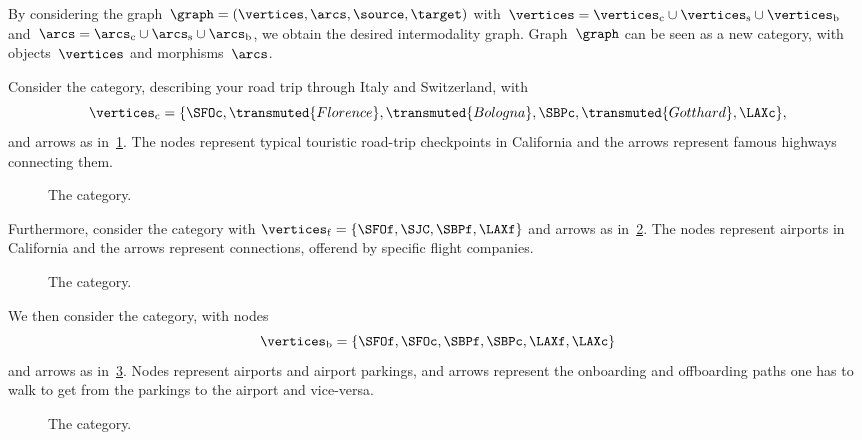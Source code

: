 By considering the graph~$\graph=(\vertices,\arcs,\source,\target)$ with~$\vertices=\vertices_\mathrm{c}\cup \vertices_\mathrm{s}\cup \vertices_\mathrm{b}$ and~$\arcs=\arcs_\mathrm{c}\cup \arcs_\mathrm{s}\cup \arcs_\mathrm{b}$, we obtain the desired intermodality graph. Graph~$\graph$ can be seen as a new category, with objects~$\vertices$ and morphisms~$\arcs$.
\begin{example}
  Consider the \Car category, describing your road trip through Italy and Switzerland, with
  \begin{equation*}
    \vertices_\mathrm{c}=\{\SFOc, \transmuted{Florence},\transmuted{Bologna},\SBPc,\transmuted{Gotthard},\LAXc\},
  \end{equation*}
  and arrows as in~\cref{fig:carcat}. The nodes represent typical touristic road-trip checkpoints in California and the arrows represent famous highways connecting them.

  \begin{figure}[h!]
    \begin{center}
    \end{center}
    \caption{The \Car category.}
    \label{fig:carcat}
  \end{figure}

  Furthermore, consider the \Flight category with $\vertices_\mathrm{f}=\{\SFOf, \SJC, \SBPf, \LAXf\}$ and arrows as in~\cref{fig:flight}. The nodes represent airports in California and the arrows represent connections, offerend by specific flight companies.

  \begin{figure}[h!]
    \begin{center}
    \end{center}
    \caption{The \Flight category.}
     \label{fig:flight}
  \end{figure}

  We then consider the \Board category, with nodes
  \begin{equation*}
    \vertices_\mathrm{b}=\{\SFOf,\SFOc,\SBPf,\SBPc,\LAXf,\LAXc\}
  \end{equation*}
  and arrows as in~\cref{fig:boarding}. Nodes represent airports and airport parkings, and arrows represent the onboarding and offboarding paths one has to walk to get from the parkings to the airport and vice-versa.

  \begin{figure}[h!]
    \begin{center}
    \end{center}
    \caption{The \Board category. }
    \label{fig:boarding}
  \end{figure}
  

\end{example}
